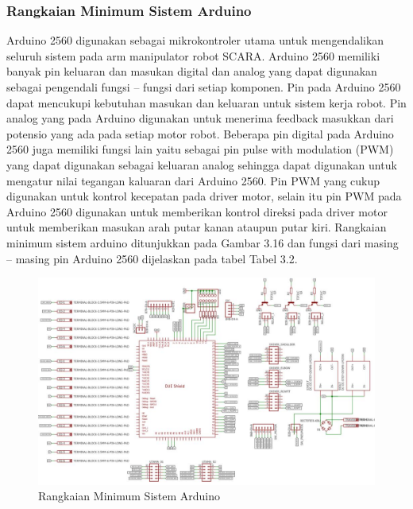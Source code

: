\subsubsection{Rangkaian Minimum Sistem Arduino}
Arduino  2560 digunakan sebagai mikrokontroler utama untuk mengendalikan seluruh sistem pada arm manipulator robot SCARA. Arduino  2560 memiliki banyak pin keluaran dan masukan digital dan analog yang dapat digunakan sebagai pengendali fungsi – fungsi dari setiap komponen. Pin pada Arduino  2560 dapat mencukupi kebutuhan masukan dan keluaran untuk sistem kerja robot. Pin analog yang pada Arduino  digunakan untuk menerima feedback masukkan dari potensio yang ada pada setiap motor robot. Beberapa pin digital pada Arduino  2560 juga  memiliki fungsi lain yaitu sebagai pin pulse with modulation (PWM) yang dapat digunakan sebagai keluaran analog sehingga dapat digunakan untuk mengatur nilai tegangan kaluaran dari Arduino  2560. Pin PWM yang cukup digunakan untuk kontrol kecepatan pada driver motor, selain itu pin PWM pada Arduino  2560 digunakan untuk memberikan kontrol direksi pada driver motor untuk memberikan masukan arah putar kanan ataupun putar kiri. Rangkaian minimum sistem arduino ditunjukkan pada Gambar 3.16 dan fungsi dari masing – masing pin Arduino  2560 dijelaskan pada tabel Tabel 3.2. 
\begin{figure}[H]
	\centering
	\includegraphics[width=15cm]{gambar/skematik.pdf}
	\caption{Rangkaian Minimum Sistem Arduino}
\end{figure}

